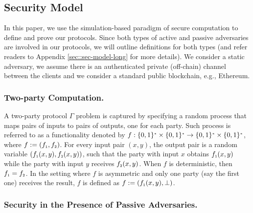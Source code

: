

\vs 
\vs

\subsection{Security Model}\label{sec::sec-model}

In this paper, we use the simulation-based paradigm of secure computation \cite{DBLP:books/cu/Goldreich2004} to define and prove our protocols. Since both types of active and passive adversaries are involved in our protocols, we will outline definitions for both types (and refer readers to Appendix \ref{sec::sec-model-long} for more details).  We consider a static adversary, we assume there is an authenticated private (off-chain) channel between the clients and we consider a standard public blockchain, e.g., Ethereum.
%
 
 \vs
 \vs
 \subsubsection{Two-party Computation.} A two-party protocol $\Gamma$ problem is captured by specifying a random process that maps pairs of inputs to pairs of outputs, one for each party. Such process is referred to as a functionality denoted by  $f:\{0,1\}^{\scriptscriptstyle *}\times\{0,1\}^{\scriptscriptstyle *}\rightarrow\{0,1\}^{\scriptscriptstyle *}\times\{0,1\}^{\scriptscriptstyle *}$, where $f:=(f_{\scriptscriptstyle 1},f_{\scriptscriptstyle 2})$. For every input pair $(x,y)$, the output pair is a random variable $(f_{\scriptscriptstyle 1} (x,y), f_{\scriptscriptstyle 2} (x,y))$, such that the party with input $x$ obtains $f_{\scriptscriptstyle 1} (x,y)$ while the party with input $y$ receives $f_{\scriptscriptstyle 2} (x,y)$. When $f$ is deterministic, then $f_{\scriptscriptstyle 1} =f_{\scriptscriptstyle 2}$. In the setting where $f$ is asymmetric and only one party (say the first one) receives the result, $f$ is defined as $f:=(f_{\scriptscriptstyle 1}(x,y), \bot)$. 
 
 \vs
 \vs
 \subsubsection{Security in the Presence of Passive Adversaries.} 
 
  
